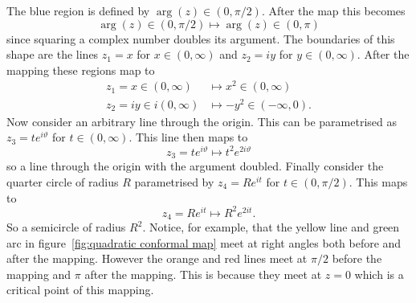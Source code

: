 \documentclass{article}
\begin{document}
    The blue region is defined by \(\arg(z) \in (0, \pi/2)\).
    After the map this becomes
    \[\arg(z) \in (0, \pi/2) \mapsto \arg(z) \in (0, \pi)\]
    since squaring a complex number doubles its argument.
    The boundaries of this shape are the lines \(z_1 = x\) for \(x \in (0, \infty)\) and \(z_2 = iy\) for \(y \in (0, \infty)\).
    After the mapping these regions map to
    \begin{align*}
        z_1 = x \in (0, \infty) &\mapsto x^2 \in(0, \infty)\\
        z_2 = iy \in i(0, \infty) &\mapsto -y^2 \in(-\infty, 0).
    \end{align*}
    Now consider an arbitrary line through the origin.
    This can be parametrised as \(z_3 = te^{i\vartheta}\) for \(t\in(0, \infty)\).
    This line then maps to
    \[z_3 = te^{i\vartheta} \mapsto t^2e^{2i\vartheta}\]
    so a line through the origin with the argument doubled.
    Finally consider the quarter circle of radius \(R\) parametrised by \(z_4 = Re^{it}\) for \(t\in(0, \pi/2)\).
    This maps to
    \[z_4 = Re^{it} \mapsto R^2e^{2it}.\]
    So a semicircle of radius \(R^2\).
    Notice, for example, that the yellow line and green arc in figure~\ref{fig:quadratic conformal map} meet at right angles both before and after the mapping.
    However the orange and red lines meet at \(\pi/2\) before the mapping and \(\pi\) after the mapping.
    This is because they meet at \(z = 0\) which is a critical point of this mapping.
    
\end{document}
